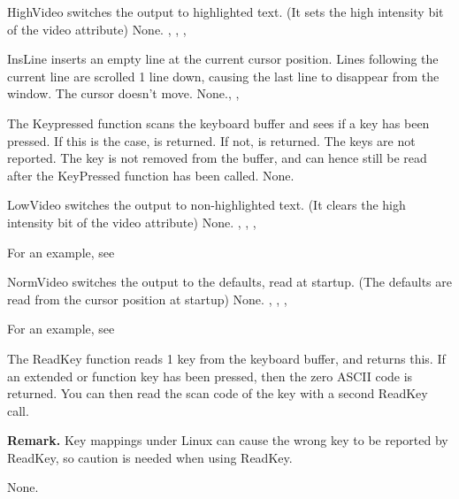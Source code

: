  \html{}

{ HighVideo switches the output to highlighted text. (It sets the high
intensity bit of the video attribute)
}
{None.}{ , , ,
}

 \html{}

{ InsLine inserts an empty line at the current cursor position. 
Lines following the current line are scrolled 1 line down, 
causing the last line to disappear from the window. 
The cursor doesn't move.}
{None.}{, , }

 \html{}

{ The Keypressed function scans the keyboard buffer and sees if a key has
been pressed. If this is the case,  is returned. If not,
 is returned. The  keys are not reported.
The key is not removed from the buffer, and can hence still be read after
the KeyPressed function has been called.
}
{None.}{}

 \html{}

{ LowVideo switches the output to non-highlighted text. (It clears the high
intensity bit of the video attribute)
}
{None.}{ , , ,
}

For an example, see 

{ NormVideo switches the output to the defaults, read at startup. (The
defaults are read from the cursor position at startup)
}
{None.}{ , , ,
}

For an example, see 


 \html{}

{
The ReadKey function reads 1 key from the keyboard buffer, and returns this.
If an extended or function key has been pressed, then the zero ASCII code is 
returned. You can then read the scan code of the key with a second ReadKey
call.

\textbf{Remark.} Key mappings under Linux can cause the wrong key to be
reported by ReadKey, so caution is needed when using ReadKey.  
}
{None.}{}

